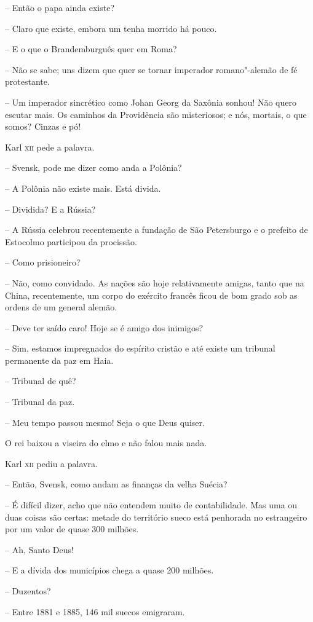 -- Então o papa ainda existe?

-- Claro que existe, embora um tenha morrido há pouco.

-- E o que o Brandemburguês quer em Roma?

-- Não se sabe; uns dizem que quer se tornar imperador romano"-alemão de
fé protestante.

-- Um imperador sincrético como Johan Georg da Saxônia sonhou! Não quero
escutar mais. Os caminhos da Providência são misteriosos; e nós,
mortais, o que somos? Cinzas e pó!

Karl \textsc{xii} pede a palavra.

-- Svensk, pode me dizer como anda a Polônia?

-- A Polônia não existe mais. Está divida.

-- Dividida? E a Rússia?

-- A Rússia celebrou recentemente a fundação de São Petersburgo e o
prefeito de Estocolmo participou da procissão.

-- Como prisioneiro?

-- Não, como convidado. As nações são hoje relativamente amigas, tanto
que na China, recentemente, um corpo do exército francês ficou de bom
grado sob as ordens de um general alemão.

-- Deve ter saído caro! Hoje se é amigo dos inimigos?

-- Sim, estamos impregnados do espírito cristão e até existe um tribunal
permanente da paz em Haia.

-- Tribunal de quê?

-- Tribunal da paz.

-- Meu tempo passou mesmo! Seja o que Deus quiser.

O rei baixou a viseira do elmo e não falou mais nada.

Karl \textsc{xii} pediu a palavra.

-- Então, Svensk, como andam as finanças da velha Suécia?

-- É difícil dizer, acho que não entendem muito de contabilidade. Mas uma
ou duas coisas são certas: metade do território sueco está penhorada no
estrangeiro por um valor de quase 300 milhões.

-- Ah, Santo Deus!

-- E a dívida dos municípios chega a quase 200 milhões.

-- Duzentos?

-- Entre 1881 e 1885, 146 mil suecos emigraram.

